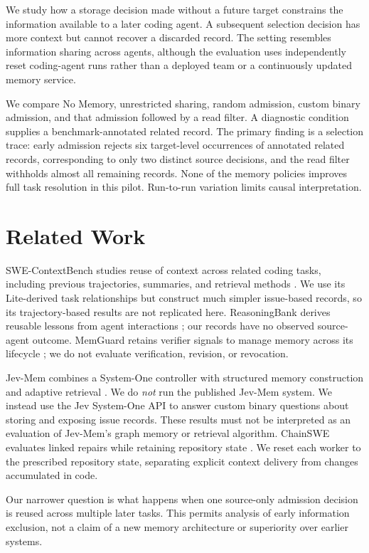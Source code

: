 \documentclass[sigconf,anonymous]{aamas}
\begin{document}
We study how a storage decision made without a future target constrains the information available to a later coding agent. A subsequent selection decision has more context but cannot recover a discarded record. The setting resembles information sharing across agents, although the evaluation uses independently reset coding-agent runs rather than a deployed team or a continuously updated memory service.

We compare No Memory, unrestricted sharing, random admission, custom binary admission, and that admission followed by a read filter. A diagnostic condition supplies a benchmark-annotated related record. The primary finding is a selection trace: early admission rejects six target-level occurrences of annotated related records, corresponding to only two distinct source decisions, and the read filter withholds almost all remaining records. None of the memory policies improves full task resolution in this pilot. Run-to-run variation limits causal interpretation.

\section{Related Work}
SWE-ContextBench studies reuse of context across related coding tasks, including previous trajectories, summaries, and retrieval methods \cite{zhu2026swecontext}. We use its Lite-derived task relationships but construct much simpler issue-based records, so its trajectory-based results are not replicated here. ReasoningBank derives reusable lessons from agent interactions \cite{ouyang2025reasoningbank}; our records have no observed source-agent outcome. MemGuard retains verifier signals to manage memory across its lifecycle \cite{wang2026memguard}; we do not evaluate verification, revision, or revocation.

Jev-Mem combines a System-One controller with structured memory construction and adaptive retrieval \cite{jiang2026jevmem}. We do \emph{not} run the published Jev-Mem system. We instead use the Jev System-One API to answer custom binary questions about storing and exposing issue records. These results must not be interpreted as an evaluation of Jev-Mem's graph memory or retrieval algorithm. ChainSWE evaluates linked repairs while retaining repository state \cite{jin2026chainswe}. We reset each worker to the prescribed repository state, separating explicit context delivery from changes accumulated in code.

Our narrower question is what happens when one source-only admission decision is reused across multiple later tasks. This permits analysis of early information exclusion, not a claim of a new memory architecture or superiority over earlier systems.
\end{document}

